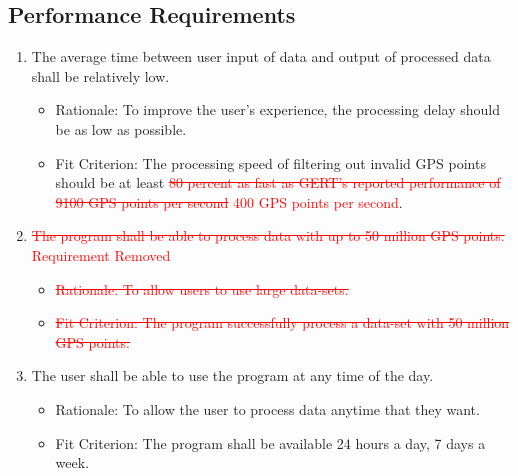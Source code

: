 \documentclass[12pt, titlepage]{article}
\begin{document}
\subsection{Performance Requirements}
\begin{enumerate}[{PR}1. ]
\item \label{PR1} The average time between user input of data and output of processed data shall be relatively low.
    \begin{itemize} 
        \item Rationale: To improve the user's experience, the processing delay should be as low as possible.
        \item Fit Criterion: The processing speed of filtering out invalid GPS points should be at least \textcolor{red}{\sout{80 percent as fast as GERT's reported performance of 9100 GPS points per second} 400 GPS points per second}.
    \end{itemize} 
    
\item \label{PR2} \textcolor{red}{\sout{The program shall be able to process data with up to 50 million GPS points.} Requirement Removed}
    \begin{itemize} 
        \item \textcolor{red}{\sout{Rationale: To allow users to use large data-sets.}}
        \item \textcolor{red}{\sout{Fit Criterion: The program successfully process a data-set with 50 million GPS points.}}
    \end{itemize}

\item \label{PR3} The user shall be able to use the program at any time of the day.
    \begin{itemize} 
        \item Rationale: To allow the user to process data anytime that they want.
        \item Fit Criterion: The program shall be available 24 hours a day, 7 days a week.
    \end{itemize} 

\end{enumerate}
\end{document}

